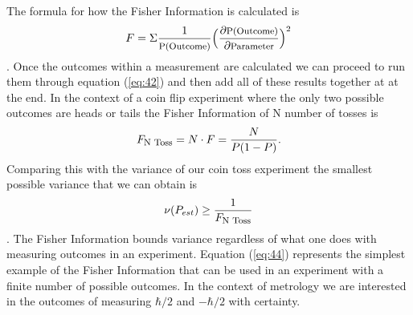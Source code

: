 \documentclass[twocolumn]{article}
\begin{document}
The formula for how the Fisher Information is calculated is 
\begin{equation} \label{eq:42}
F=\Sigma\frac{1}{\text{\footnotesize{P(Outcome)}}}\Big(\frac{\partial \text{\footnotesize{P(Outcome)}}}{\partial\text{\footnotesize{Parameter}}}\Big)^2
\end{equation}
\cite{Fisher Information}. Once the outcomes within a measurement are calculated we can proceed to run them through equation (\ref{eq:42}) and then add all of these results together at at the end. In the context of a coin flip experiment where the only two possible outcomes are heads or tails the Fisher Information of N number of tosses is
\begin{equation} 
F_{\text{\footnotesize{N Toss}}}=N\cdot F=\frac{N}{P(1-P)}.
\end{equation}
Comparing this with the variance of our coin toss experiment the smallest possible variance that we can obtain is
\begin{equation} \label{eq:44}
\nu(P_{est})\geq\frac{1}{F_{\text{\footnotesize{N Toss}}}}
\end{equation}
\cite{D. Collins}. The Fisher Information bounds variance regardless of what one does with measuring outcomes in an experiment. Equation (\ref{eq:44}) represents the simplest example of the Fisher Information that can be used in an experiment with a finite number of possible outcomes. In the context of metrology we are interested in the outcomes of measuring $\hbar/2$ and $-\hbar/2$ with certainty.
\end{document}
